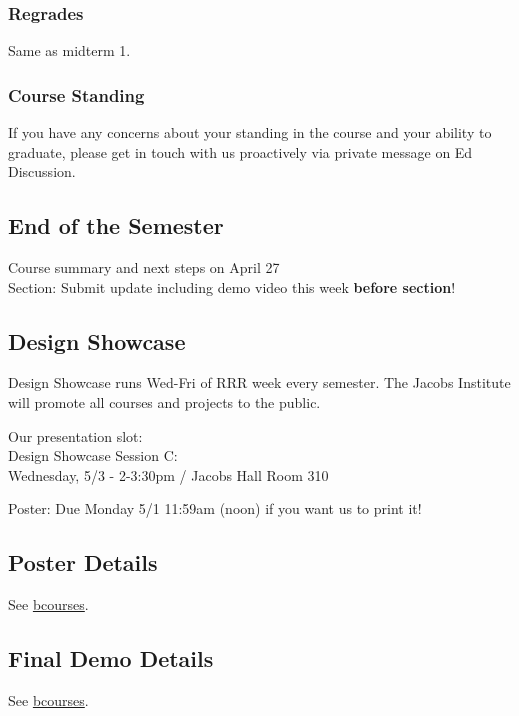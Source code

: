 \subsubsection{Regrades}
Same as midterm 1.

\subsubsection{Course Standing}
If you have any concerns about your standing in the
course and your ability to graduate, please get in
touch with us proactively via private message on Ed
Discussion.

\subsection{End of the Semester}
Course summary and next steps on April 27\\
Section: Submit update including demo video this week \textbf{before section}!

\subsection{Design Showcase}
Design Showcase runs Wed-Fri of RRR week every semester. The Jacobs Institute will promote all courses and projects to the public.

Our presentation slot:\\
Design Showcase Session C:\\
Wednesday, 5/3 - 2-3:30pm / Jacobs Hall Room 310

Poster: Due Monday 5/1 11:59am (noon) if you want us to print it!

\subsection{Poster Details}
See \href{https://bcourses.berkeley.edu/courses/1523321/assignments/8584015}{bcourses}.

\subsection{Final Demo Details}
See \href{https://bcourses.berkeley.edu/courses/1523321/assignments/8578979}{bcourses}.
